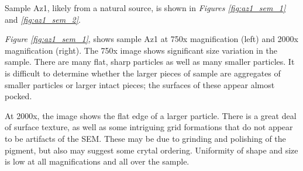 
Sample Az1, likely from a natural source, is shown in \textit{Figures \ref{fig:az1_sem_1}} and \textit{\ref{fig:az1_sem_2}}. 

\textit{Figure \ref{fig:az1_sem_1}}, shows sample Az1 at 750x magnification (left) and 2000x magnification (right). The 750x image shows significant size variation in the sample. There are many flat, sharp particles as well as many smaller particles. It is difficult to determine whether the larger pieces of sample are aggregates of smaller particles or larger intact pieces; the surfaces of these appear almost pocked.

At 2000x, the image shows the flat edge of a larger particle. There is a great deal of surface texture, as well as some intriguing grid formations that do not appear to be artifacts of the SEM. These may be due to grinding and polishing of the pigment, but also may suggest some crytal ordering. Uniformity of shape and size is low at all magnifications and all over the sample.


